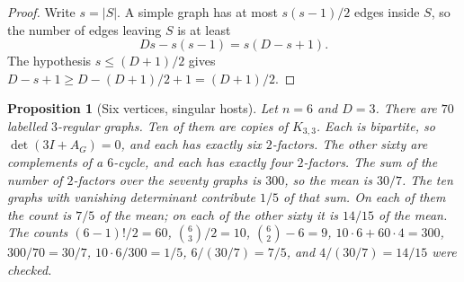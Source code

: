 \documentclass[11pt]{article}
\newtheorem{proposition}[theorem]{Proposition}
\begin{document}
\begin{proof}
Write \(s=|S|\). A simple graph has at most \(s(s-1)/2\) edges inside \(S\), so
the number of edges leaving \(S\) is at least
\[
Ds-s(s-1)=s(D-s+1).
\]
The hypothesis \(s\le (D+1)/2\) gives \(D-s+1\ge D-(D+1)/2+1=(D+1)/2\).
\end{proof}

\begin{proposition}[Six vertices, singular hosts]
\label{prop:six-det-mass}
Let \(n=6\) and \(D=3\).
There are \(70\) labelled \(3\)-regular graphs.
Ten of them are copies of \(K_{3,3}\).
Each is bipartite, so \(\det(3I+A_G)=0\), and each has exactly six \(2\)-factors.
The other sixty are complements of a \(6\)-cycle, and each has exactly four
\(2\)-factors.
The sum of the number of \(2\)-factors over the seventy graphs is \(300\), so the
mean is \(30/7\).
The ten graphs with vanishing determinant contribute \(1/5\) of that sum.
On each of them the count is \(7/5\) of the mean; on each of the other sixty it
is \(14/15\) of the mean.
The counts \((6-1)!/2=60\), \(\binom{6}{3}/2=10\), \(\binom{6}{2}-6=9\),
\(10\cdot 6+60\cdot 4=300\), \(300/70=30/7\), \(10\cdot 6/300=1/5\),
\(6/(30/7)=7/5\), and \(4/(30/7)=14/15\) were checked.
\end{proposition}
\end{document}
